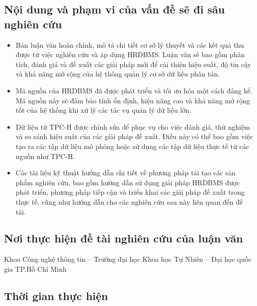 \documentclass{article}[14pt]
\begin{document}
{\subsection{Nội dung và phạm vi của vấn đề sẽ đi sâu nghiên cứu}
\begin{itemize}
\item Bản luận văn hoàn chỉnh, mô tả chi tiết cơ sở lý thuyết và các kết quả thu được từ việc nghiên cứu và áp dụng HRDBMS. Luận văn sẽ bao gồm phân tích, đánh giá và đề xuất các giải pháp mới để cải thiện hiệu suất, độ tin cậy và khả năng mở rộng của hệ thống quản lý cơ sở dữ liệu phân tán.
\item Mã nguồn của HRDBMS đã được phát triển và tối ưu hóa một cách đáng kể. Mã nguồn này sẽ đảm bảo tính ổn định, hiệu năng cao và khả năng mở rộng tốt của hệ thống khi xử lý các tác vụ quản lý dữ liệu lớn.
\item Dữ liệu từ TPC-H được chỉnh sửa để phục vụ cho việc đánh giá, thử nghiệm và so sánh hiệu suất của các giải pháp đề xuất. Điều này có thể bao gồm việc tạo ra các tập dữ liệu mô phỏng hoặc sử dụng các tập dữ liệu thực tế từ các nguồn như TPC-H.
\item Các tài liệu kỹ thuật hướng dẫn chi tiết về phương pháp tái tạo các sản phẩm nghiên cứu, bao gồm hướng dẫn sử dụng giải pháp HRDBMS được phát triển, phương pháp tiếp cận và triển khai các giải pháp đề xuất trong thực tế, cũng như hướng dẫn cho các nghiên cứu sau này liên quan đến đề tài.
\end{itemize}

\subsection{Nơi thực hiện đề tài nghiên cứu của luận văn}
Khoa Công nghệ thông tin – Trường đại học Khoa học Tự Nhiên – Đại học quốc gia TP.Hồ Chí Minh
    
\subsection{Thời gian thực hiện}

}
\end{document}

